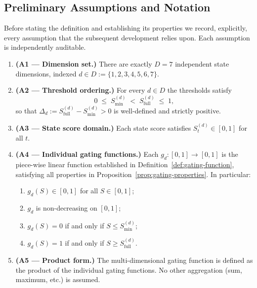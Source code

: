 \documentclass[12pt,openany]{book}
\numberwithin{equation}{chapter}
\theoremstyle{plain}
\theoremstyle{definition}
\theoremstyle{remark}
\def\mathcal#1{#1}%
\begin{document}
\subsection{Preliminary Assumptions and Notation}

Before stating the definition and establishing its properties
we record, explicitly, every assumption that the subsequent
development relies upon.  Each assumption is independently
auditable.

\begin{enumerate}
  \item \textbf{(A1 — Dimension set.)}
        There are exactly $D = 7$ independent state dimensions,
        indexed $d \in \mathcal{D} := \{1,2,3,4,5,6,7\}$.
  \item \textbf{(A2 — Threshold ordering.)}
        For every $d \in \mathcal{D}$ the thresholds satisfy
        \begin{equation}
          0 \;\leq\; \mathcal{S}_{\min}^{(d)}
            \;<\; \mathcal{S}_{\mathrm{full}}^{(d)}
            \;\leq\; 1,
          \label{eq:threshold-ordering-2}
        \end{equation}
        so that $\Delta_d :=
        \mathcal{S}_{\mathrm{full}}^{(d)} - \mathcal{S}_{\min}^{(d)} > 0$
        is well-defined and strictly positive.
  \item \textbf{(A3 — State score domain.)}
        Each state score satisfies
        $\mathcal{S}_t^{(d)} \in [0,1]$ for all $t$.
  \item \textbf{(A4 — Individual gating functions.)}
        Each $g_d : [0,1] \to [0,1]$ is the
        piece-wise linear function established in
        Definition~\ref{def:gating-function}, satisfying all
        properties in Proposition~\ref{prop:gating-properties}.
        In particular:
        \begin{enumerate}
          \item $g_d(\mathcal{S}) \in [0,1]$ for all
                $\mathcal{S} \in [0,1]$;
          \item $g_d$ is non-decreasing on $[0,1]$;
          \item $g_d(\mathcal{S}) = 0$ if and only if
                $\mathcal{S} \leq \mathcal{S}_{\min}^{(d)}$;
          \item $g_d(\mathcal{S}) = 1$ if and only if
                $\mathcal{S} \geq \mathcal{S}_{\mathrm{full}}^{(d)}$.
        \end{enumerate}
  \item \textbf{(A5 — Product form.)}
        The multi-dimensional gating function is defined as the
        product of the individual gating functions.  No other
        aggregation (sum, maximum, etc.) is assumed.
\end{enumerate}
\end{document}
